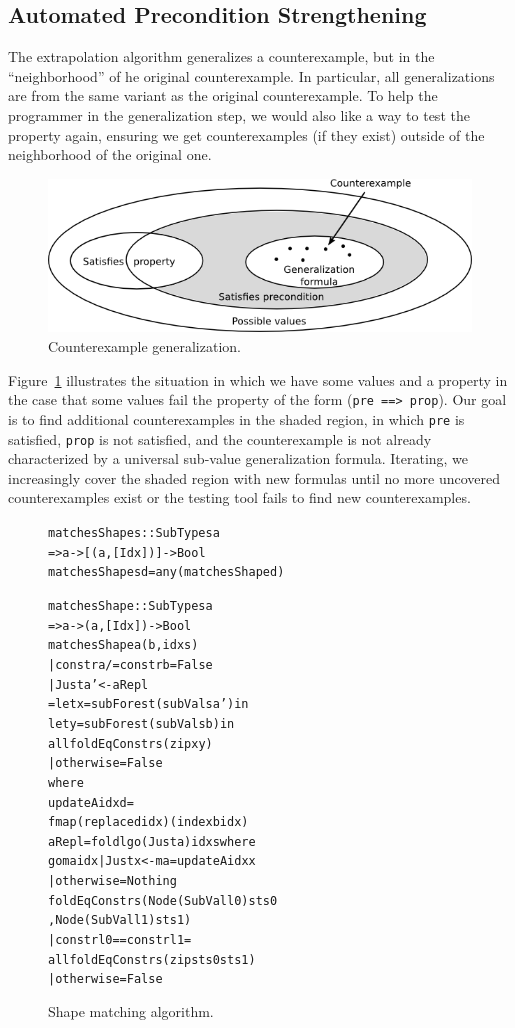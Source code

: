 \documentclass{sigplanconf}
\newenvironment{code}{\begin{alltt}}{\end{alltt}}
\newcommand{\ttp}[1]{\texttt{#1}}
\begin{document}
\subsection{Automated Precondition Strengthening}\label{sec:precondition}
The extrapolation algorithm generalizes a counterexample, but in the
``neighborhood'' of he original counterexample.  In particular, all
generalizations are from the same variant as the original counterexample.  To
help the programmer in the generalization step, we would also like a way to test
the property again, ensuring we get counterexamples (if they exist) outside of
the neighborhood of the original one.

\begin{figure}[ht!]
  \begin{center}
    \includegraphics[scale=0.49]{Figs/cex-gen}
   \end{center}
  \caption{Counterexample generalization.}
  \label{fig:cex-gen}
\end{figure}

Figure~\ref{fig:cex-gen} illustrates the situation in which we have some values
and a property in the case that some values fail the property of the form
(\ttp{pre ==> prop}).  Our goal is to find additional counterexamples in the
shaded region, in which \ttp{pre} is satisfied, \ttp{prop} is not satisfied, and
the counterexample is not already characterized by a universal sub-value
generalization formula.  Iterating, we increasingly cover the shaded region
with new formulas until no more uncovered counterexamples exist or the testing
tool fails to find new counterexamples.

\begin{figure}
  \begin{code}
matchesShapes :: SubTypes a
  => a -> [(a,[Idx])] -> Bool
matchesShapes d = any (matchesShape d)

matchesShape :: SubTypes a
  => a -> (a, [Idx]) -> Bool
matchesShape a (b, idxs)
  | constr a /= constr b = False
  | Just a' <- aRepl
  = let x = subForest (subVals a') in
    let y = subForest (subVals b)  in
    all foldEqConstrs (zip x y)
  | otherwise = False
  where
  updateA idx d =
    fmap (replace d idx) (index b idx)
  aRepl = foldl go (Just a) idxs where
    go ma idx | Just x <- ma = updateA idx x
              | otherwise    = Nothing
  foldEqConstrs ( Node (SubVal l0) sts0
                , Node (SubVal l1) sts1 )
    | constr l0 == constr l1 =
      all foldEqConstrs (zip sts0 sts1)
    | otherwise              = False
  \end{code}
  \caption{Shape matching algorithm.}
  \label{fig:matches}
\end{figure}
\end{document}
